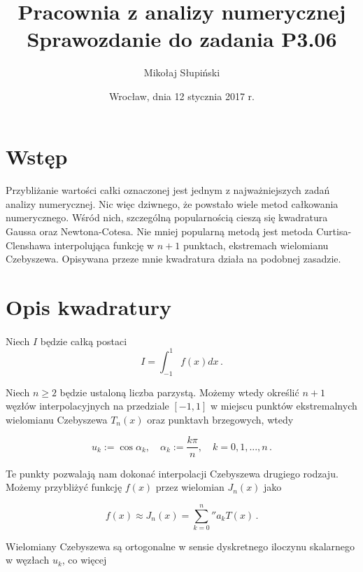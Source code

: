 \documentclass{article}
\title{Pracownia z analizy numerycznej \\ Sprawozdanie do zadania P3.06}
\author{Mikołaj Słupiński}
\date{Wrocław, dnia 12 stycznia 2017 r.}
\begin{document}
  \maketitle
  \section{Wstęp}
    \paragraph{}Przybliżanie wartości całki oznaczonej jest jednym z najważniejszych
    zadań analizy numerycznej. Nic więc dziwnego, że powstało wiele metod całkowania
    numerycznego. Wśród nich, szczególną popularnością cieszą się kwadratura Gaussa
    oraz Newtona-Cotesa. Nie mniej popularną metodą jest metoda Curtisa-Clenshawa
    interpolująca funkcję w $n+1$ punktach, ekstremach wielomianu Czebyszewa. Opisywana
    przeze mnie kwadratura działa na podobnej zasadzie.

  \section{Opis kwadratury}
    \paragraph{} Niech $I$ będzie całką postaci
      \begin{equation*}
        I = \int_{-1}^{1}f(x)dx\,.
      \end{equation*}

    Niech $n \ge 2$ będzie ustaloną liczba parzystą. Możemy wtedy określić $n+1$
    węzłów interpolacyjnych na przedziale $[-1,1]$ w miejscu punktów ekstremalnych
    wielomianu Czebyszewa $T_{n}(x)$ oraz punktavh brzegowych, wtedy

      \begin{equation*}
        u_k := \cos{\alpha_k},\quad
        \alpha_k := \frac{k\pi}{n},\quad
        k = 0, 1, ..., n \,.
      \end{equation*}

    Te punkty pozwalają nam dokonać interpolacji Czebyszewa drugiego rodzaju.
    Możemy przybliżyć funkcję $f(x)$ przez wielomian $J_{n}(x)$ jako

    \begin{equation*}
      f(x) \approx J_n(x) = \sum_{k = 0}^{n}''a_{k}T(x)\,.
    \end{equation*}

    Wielomiany Czebyszewa są ortogonalne w sensie dyskretnego iloczynu skalarnego
    w węzłach $u_k$, co więcej
\end{document}
